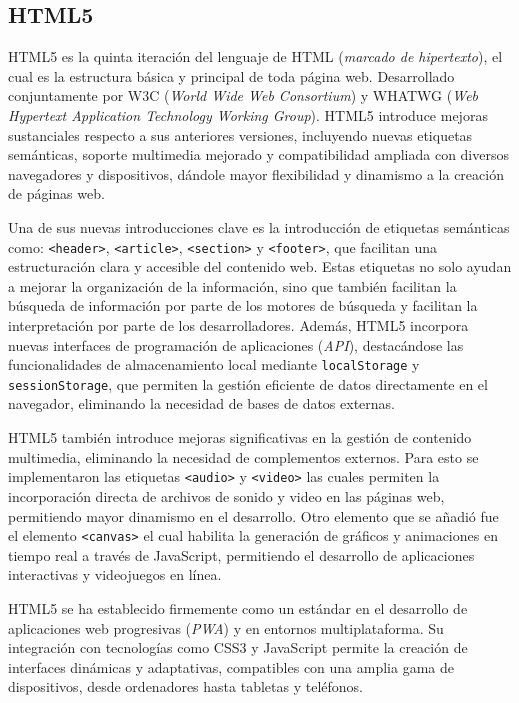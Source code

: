 \documentclass[a4paper, 12pt]{book}
\begin{document}
\subsection{HTML5}
\label{subsec:HTML5}

HTML5 \cite{freeman2018head} es la quinta iteración del lenguaje de HTML (\textit{marcado de hipertexto}), el cual es la estructura básica y principal de toda página web.
Desarrollado conjuntamente por W3C \cite{w3c_mission} (\textit{World Wide Web Consortium}) y WHATWG \cite{whatwg} (\textit{Web Hypertext Application Technology Working Group}).
HTML5 introduce mejoras sustanciales respecto a sus anteriores versiones, incluyendo nuevas etiquetas semánticas, soporte multimedia mejorado y compatibilidad
ampliada con diversos navegadores y dispositivos, dándole mayor flexibilidad y dinamismo a la creación de páginas web.

Una de sus nuevas introducciones clave es la introducción de etiquetas semánticas como: \texttt{<header>}, \texttt{<article>}, \texttt{<section>} y \texttt{<footer>},
que facilitan una estructuración clara y accesible del contenido web. Estas etiquetas no solo ayudan a mejorar la organización de la información, sino que también facilitan la búsqueda
de información por parte de los motores de búsqueda y facilitan la interpretación por parte de los desarrolladores.
Además, HTML5 incorpora nuevas interfaces de programación de aplicaciones (\textit{API}), destacándose las funcionalidades de almacenamiento local mediante
\texttt{localStorage} y \texttt{sessionStorage}, que permiten la gestión eficiente de datos directamente en el navegador, eliminando la necesidad de bases de datos externas.

HTML5 también introduce mejoras significativas en la gestión de contenido multimedia, eliminando la necesidad de complementos externos. Para esto se implementaron
las etiquetas \texttt{<audio>} y \texttt{<video>} las cuales permiten la incorporación directa de archivos de sonido y video en las páginas web, permitiendo mayor dinamismo en el desarrollo.
Otro elemento que se añadió fue el elemento \texttt{<canvas>} el cual habilita la generación de gráficos y animaciones en tiempo real a través de JavaScript, permitiendo el desarrollo de aplicaciones interactivas y videojuegos en línea.

HTML5 se ha establecido firmemente como un estándar en el desarrollo de aplicaciones web progresivas (\textit{PWA}) y en entornos multiplataforma. Su integración con tecnologías como CSS3 y JavaScript
permite la creación de interfaces dinámicas y adaptativas, compatibles con una amplia gama de dispositivos, desde ordenadores hasta tabletas y teléfonos.
\end{document}
